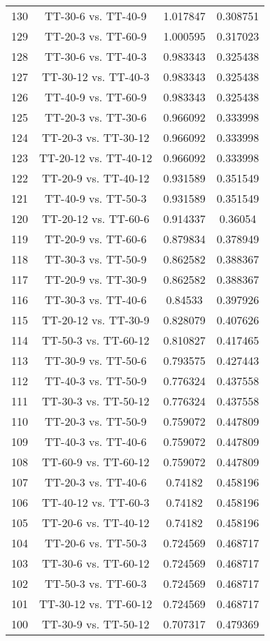 \documentclass[a4paper,10pt]{article}
\begin{document}
\begin{landscape}
\begin{table}[!htp]
\begin{tabular}{cccc}
130&TT-30-6 vs. TT-40-9&1.017847&0.308751\\
129&TT-20-3 vs. TT-60-9&1.000595&0.317023\\
128&TT-30-6 vs. TT-40-3&0.983343&0.325438\\
127&TT-30-12 vs. TT-40-3&0.983343&0.325438\\
126&TT-40-9 vs. TT-60-9&0.983343&0.325438\\
125&TT-20-3 vs. TT-30-6&0.966092&0.333998\\
124&TT-20-3 vs. TT-30-12&0.966092&0.333998\\
123&TT-20-12 vs. TT-40-12&0.966092&0.333998\\
122&TT-20-9 vs. TT-40-12&0.931589&0.351549\\
121&TT-40-9 vs. TT-50-3&0.931589&0.351549\\
120&TT-20-12 vs. TT-60-6&0.914337&0.36054\\
119&TT-20-9 vs. TT-60-6&0.879834&0.378949\\
118&TT-30-3 vs. TT-50-9&0.862582&0.388367\\
117&TT-20-9 vs. TT-30-9&0.862582&0.388367\\
116&TT-30-3 vs. TT-40-6&0.84533&0.397926\\
115&TT-20-12 vs. TT-30-9&0.828079&0.407626\\
114&TT-50-3 vs. TT-60-12&0.810827&0.417465\\
113&TT-30-9 vs. TT-50-6&0.793575&0.427443\\
112&TT-40-3 vs. TT-50-9&0.776324&0.437558\\
111&TT-30-3 vs. TT-50-12&0.776324&0.437558\\
110&TT-20-3 vs. TT-50-9&0.759072&0.447809\\
109&TT-40-3 vs. TT-40-6&0.759072&0.447809\\
108&TT-60-9 vs. TT-60-12&0.759072&0.447809\\
107&TT-20-3 vs. TT-40-6&0.74182&0.458196\\
106&TT-40-12 vs. TT-60-3&0.74182&0.458196\\
105&TT-20-6 vs. TT-40-12&0.74182&0.458196\\
104&TT-20-6 vs. TT-50-3&0.724569&0.468717\\
103&TT-30-6 vs. TT-60-12&0.724569&0.468717\\
102&TT-50-3 vs. TT-60-3&0.724569&0.468717\\
101&TT-30-12 vs. TT-60-12&0.724569&0.468717\\
100&TT-30-9 vs. TT-50-12&0.707317&0.479369\\

\end{tabular}
\end{table}
\end{landscape}
\end{document}
